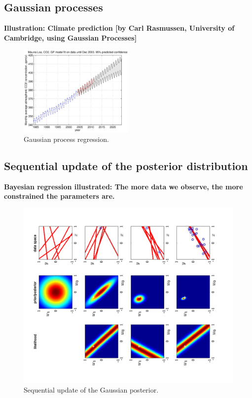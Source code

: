 \subsection{Gaussian processes}
\textbf{Illustration: Climate prediction [by Carl Rasmussen, University of Cambridge, using Gaussian Processes]}

\begin{figure}
	\centering
	\includegraphics[width=0.5\textwidth]{./lecture5/Rasmussen2}
	\caption{Gaussian process regression.}
\end{figure}


\subsection{Sequential update of the posterior distribution}
\textbf{Bayesian regression illustrated: The more data we observe, the more constrained the parameters are.}

\begin{figure}
	\includegraphics[width=\textwidth]{./lecture5/Figure37.pdf}
	\caption{Sequential update of the Gaussian posterior.}
\end{figure}




